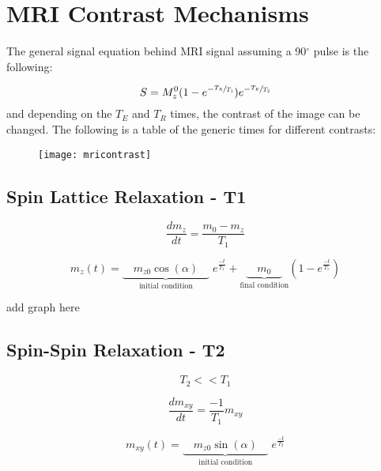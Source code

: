 \section{MRI Contrast Mechanisms}
The general signal equation behind MRI signal assuming a 90$^\circ$ pulse is the following:

\begin{equation}
S = M_z^0(1-e^{-\sfrac{T_R}{T_1}})e^{-\sfrac{T_E}{T_2}}
\end{equation}
and depending on the $T_E$ and $T_R$ times, the contrast of the image can be changed. The following is a table of the generic times for different contrasts:

\begin{figure}[h]
	\begin{center}
		\texttt{[image: mricontrast]}	
	\end{center}
\end{figure}
\subsection{Spin Lattice Relaxation - T1}
\begin{equation}
\frac{dm_z}{dt}= \frac{m_0-m_z}{T_1}
\end{equation}

\begin{equation}
m_z(t) = \underset{\text{initial condition}}{\underbrace{\quad m_{z0}\cos\left(\alpha\right)\quad}}\; e^{\frac{-t}{T_1}} + \underset{\text{final condition}}{\underbrace{\quad m_0\quad}}\left(1-e^{\frac{-t}{T_1}}\right)
\end{equation}

add graph here


\subsection{Spin-Spin Relaxation - T2}
\begin{equation}
T_2 << T_1
\end{equation}

\begin{equation}
\frac{dm_{xy}}{dt}= \frac{-1}{T_1}m_{xy}
\end{equation}

\begin{equation}
m_{xy}(t) = \underset{\text{initial condition}}{\underbrace{\quad m_{z0}\sin\left(\alpha\right)\quad}}\; e^{\frac{-t}{T_2}}
\end{equation}

